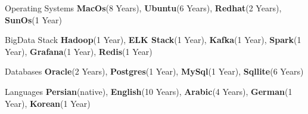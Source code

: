 \begin{cvskills}
  \cvskill
    {Operating Systems} %
    {\textbf{MacOs}(8 Years), \textbf{Ubuntu}(6 Years), \textbf{Redhat}(2 Years), \textbf{SunOs}(1 Year)} %
    
  \cvskill
    {BigData Stack} %
    {\textbf{Hadoop}(1 Year), \textbf{ELK Stack}(1 Year), \textbf{Kafka}(1 Year), \textbf{Spark}(1 Year), \textbf{Grafana}(1 Year), \textbf{Redis}(1 Year)} %


  \cvskill
    {Databases} %
    {\textbf{Oracle}(2 Years), \textbf{Postgres}(1 Year), \textbf{MySql}(1 Year), \textbf{Sqllite}(6 Years)} %

  \cvskill
    {Languages} %
    {\textbf{Persian}(native), \textbf{English}(10 Years),  \textbf{Arabic}(4 Years), \textbf{German}(1 Year), \textbf{Korean}(1 Year)} %
\end{cvskills}

